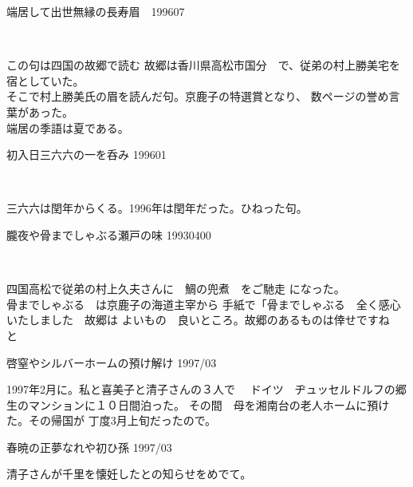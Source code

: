 \begin{shiika}端居して出世無縁の長寿眉　\hfill{199607}　\end{shiika}　　　

この句は四国の故郷で読む
故郷は香川県高松市国分　で、従弟の村上勝美宅を宿としていた。
\\そこで村上勝美氏の眉を読んだ句。京鹿子の特選賞となり、
数ページの誉め言葉があった。\\端居の季語は夏である。

\vspace{5mm}
\begin{shiika}初入日三六六の一を呑み 199601　\end{shiika}　

三六六は閏年からくる。1996年は閏年だった。ひねった句。
\vspace{5mm}
\begin{shiika}朧夜や骨までしゃぶる瀬戸の味 19930400\end{shiika}　

四国高松で従弟の村上久夫さんに　鯛の兜煮　をご馳走
になった。
\\骨までしゃぶる　は京鹿子の海道主宰から
手紙で「骨までしゃぶる　全く感心いたしました　故郷は
よいもの　良いところ。故郷のあるものは倖せですね　と
\vspace{5mm}
\begin{shiika}啓窒やシルバーホームの預け解け 1997/03\end{shiika}

1997年2月に。私と喜美子と清子さんの３人で　
ドイツ　ヂュッセルドルフの郷生のマンションに１０日間泊った。
その間　母を湘南台の老人ホームに預けた。その帰国が
丁度3月上旬だったので。
\vspace{5mm}

\begin{shiika}春暁の正夢なれや初ひ孫 1997/03\end{shiika}

清子さんが千里を懐妊したとの知らせをめでて。
